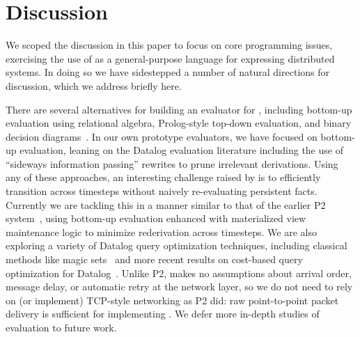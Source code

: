 \section{Discussion}
We scoped the discussion in this paper to focus on core programming issues, exercising the use of \lang as a general-purpose language for expressing distributed systems.  In doing so we have sidestepped a number of natural directions for discussion, which we address briefly here.
    
There are several alternatives for building an evaluator for \lang, including
bottom-up evaluation using relational algebra, Prolog-style top-down evaluation,
and binary decision diagrams~\cite{bdd-datalog}.  In our own prototype
evaluators, we have focused on bottom-up evaluation, leaning on the Datalog
evaluation literature including the use of ``sideways information passing''
rewrites to prune irrelevant derivations.  Using any of these approaches, an
interesting challenge raised by \lang is to efficiently transition across
timesteps without naively re-evaluating persistent facts.  Currently we are
tackling this in a manner similar to that of the earlier P2 system~\cite{p2},
using bottom-up evaluation enhanced with materialized view maintenance logic to
minimize rederivation across timesteps. We are also exploring a variety of
Datalog query optimization techniques, including classical methods like magic
sets~\cite{ullmanbook} and more recent results on cost-based query optimization
for Datalog~\cite{demoor}.  Unlike P2, \lang makes no assumptions about arrival
order, message delay, or automatic retry at the network layer, so we do not need
to rely on (or implement) TCP-style networking as P2 did: raw point-to-point
packet delivery is sufficient for implementing \lang.  We defer more in-depth
studies of \lang evaluation to future work.


